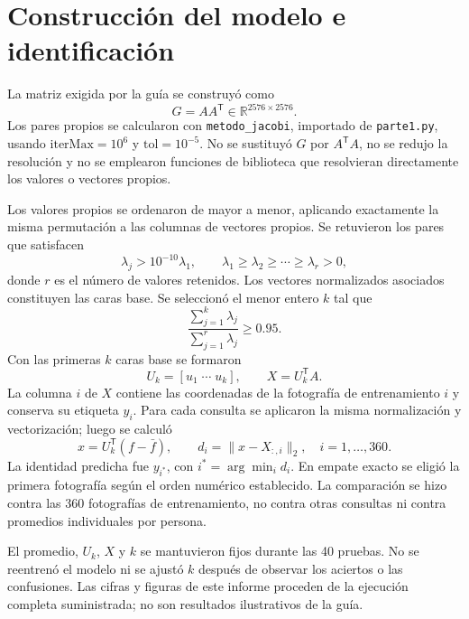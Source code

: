 \documentclass[11pt,a4paper]{article}
\newcommand{\archivo}[1]{\texttt{#1}}
\begin{document}
\clearpage
\section{Construcción del modelo e identificación}
La matriz exigida por la guía se construyó como
\begin{equation}
G=AA^{\mathsf T}\in\mathbb{R}^{2576\times2576}.
\end{equation}
Los pares propios se calcularon con \archivo{metodo\_jacobi}, importado de
\archivo{parte1.py}, usando $\mathrm{iterMax}=10^6$ y
$\mathrm{tol}=10^{-5}$. No se sustituyó $G$ por $A^{\mathsf T}A$, no se redujo la
resolución y no se emplearon funciones de biblioteca que resolvieran directamente
los valores o vectores propios.

Los valores propios se ordenaron de mayor a menor, aplicando exactamente la misma
permutación a las columnas de vectores propios. Se retuvieron los pares que
satisfacen
\begin{equation}
\lambda_j>10^{-10}\lambda_1,
\qquad \lambda_1\geq\lambda_2\geq\cdots\geq\lambda_r>0,
\end{equation}
donde $r$ es el número de valores retenidos. Los vectores normalizados asociados
constituyen las caras base. Se seleccionó el menor entero $k$ tal que
\begin{equation}
\frac{\sum_{j=1}^{k}\lambda_j}{\sum_{j=1}^{r}\lambda_j}\geq0.95.
\end{equation}
Con las primeras $k$ caras base se formaron
\begin{equation}
U_k=[u_1\;\cdots\;u_k],\qquad X=U_k^{\mathsf T}A.
\end{equation}
La columna $i$ de $X$ contiene las coordenadas de la fotografía de entrenamiento
$i$ y conserva su etiqueta $y_i$. Para cada consulta se aplicaron la misma
normalización y vectorización; luego se calculó
\begin{equation}
x=U_k^{\mathsf T}(f-\bar f),\qquad
d_i=\lVert x-X_{:,i}\rVert_2,\quad i=1,\ldots,360.
\end{equation}
La identidad predicha fue $y_{i^*}$, con $i^*=\arg\min_i d_i$. En empate exacto
se eligió la primera fotografía según el orden numérico establecido. La
comparación se hizo contra las 360 fotografías de entrenamiento, no contra otras
consultas ni contra promedios individuales por persona.

El promedio, $U_k$, $X$ y $k$ se mantuvieron fijos durante las 40 pruebas. No se
reentrenó el modelo ni se ajustó $k$ después de observar los aciertos o las
confusiones. Las cifras y figuras de este informe proceden de la ejecución
completa suministrada; no son resultados ilustrativos de la guía.
\end{document}
